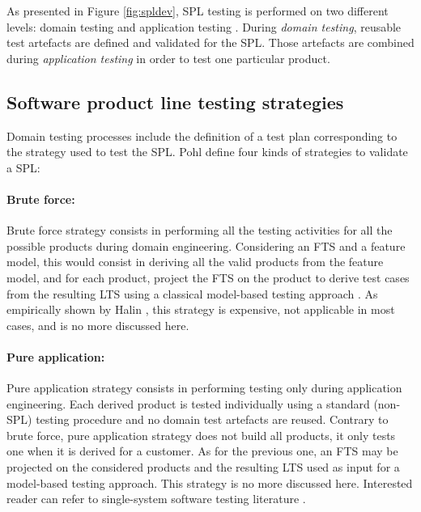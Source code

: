 \label{sec:spltesting}

As presented in Figure \ref{fig:spldev}, \gls{SPL} testing is performed on two different levels: domain testing and application testing \cite{Pohl2005}. During \emph{domain testing}, reusable test artefacts are defined and validated for the SPL. Those artefacts are combined during \emph{application testing} in order to test one particular product. 

\subsection{Software product line testing strategies}

Domain testing processes include the definition of a test plan corresponding to the strategy used to test the SPL. Pohl \etal \cite{Pohl2005} define four kinds of strategies to validate a \gls{SPL}:

\paragraph{Brute force:} 

Brute force strategy consists in performing all the testing activities for all the possible products during domain engineering. 
Considering an \gls{FTS} and a \gls{feature model}, this would consist in deriving all the valid products from the feature model, and for each product, project the FTS on the product to derive test cases from the resulting \gls{LTS} using a classical model-based testing approach \cite{Utting2007}.
As empirically shown by Halin \etal \cite{Halin2017,Halin2017b}, this strategy is expensive, not applicable in most cases, and is no more discussed here.


\paragraph{Pure application:} 

Pure application strategy consists in performing testing only during application engineering. Each derived product is tested individually using a standard (non-SPL) testing procedure and no domain test artefacts are reused. Contrary to brute force, pure application strategy does not build all products, it only tests one when it is derived for a customer. 
As for the previous one, an \gls{FTS} may be projected on the considered products and the resulting \gls{LTS} used as input for a model-based testing approach.
This strategy is no more discussed here. Interested reader can refer to single-system software testing literature \cite{Mathur2008,Utting2007}.


